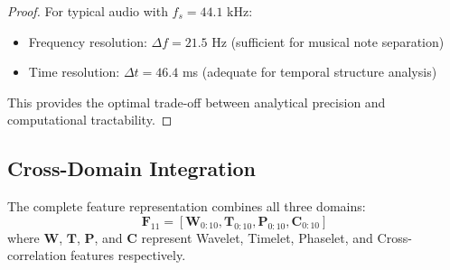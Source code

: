 \begin{proof}
For typical audio with $f_s = 44.1$ kHz:
\begin{itemize}
    \item Frequency resolution: $\Delta f = 21.5$ Hz (sufficient for musical note separation)
    \item Time resolution: $\Delta t = 46.4$ ms (adequate for temporal structure analysis)
\end{itemize}
This provides the optimal trade-off between analytical precision and computational tractability.
\end{proof}

\subsection{Cross-Domain Integration}

\begin{definition}
The complete feature representation combines all three domains:
\begin{equation}
\mathbf{F}_{11} = [\mathbf{W}_{0:10}, \mathbf{T}_{0:10}, \mathbf{P}_{0:10}, \mathbf{C}_{0:10}]
\end{equation}
where $\mathbf{W}$, $\mathbf{T}$, $\mathbf{P}$, and $\mathbf{C}$ represent Wavelet, Timelet, Phaselet, and Cross-correlation features respectively.
\end{definition}